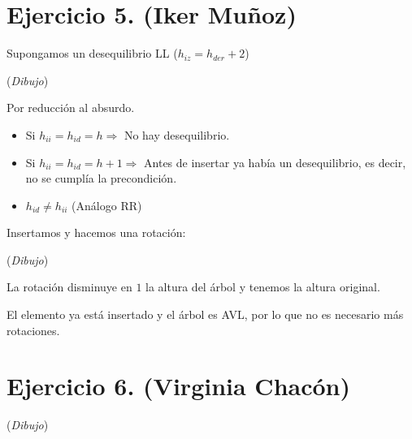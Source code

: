 \documentclass[10pt,a4paper,openright]{book}
\theoremstyle{break}
\begin{document}
\section{Ejercicio 5. (Iker Muñoz)}%
\label{sec:ejercicio_5_iker_munoz_}
Supongamos un desequilibrio LL ($h_{iz} = h_{der} + 2$)

(\textit{Dibujo})

Por reducción al absurdo. 
\begin{itemize}
    \item Si $h_{ii} = h_{id} = h \Rightarrow$ No hay desequilibrio.
    \item Si $h_{ii} = h_{id} = h+1 \Rightarrow$ Antes de insertar ya había un desequilibrio, es decir, no se cumplía la precondición.
    \item $h_{id} \neq h_{ii}$ (Análogo RR)
\end{itemize}

Insertamos y hacemos una rotación:

(\textit{Dibujo}) 

La rotación disminuye en $1$ la altura del árbol y tenemos la altura original. 

El elemento ya está insertado y el árbol es AVL, por lo que no es necesario más rotaciones.

\section{Ejercicio 6. (Virginia Chacón)}%
\label{sec:ejercicio_6_virginia_chacón_}
(\textit{Dibujo}) 
\end{document}
